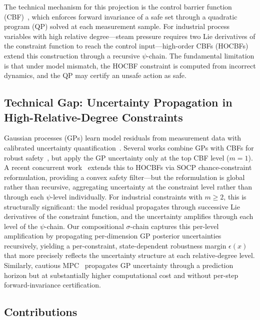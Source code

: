 The technical mechanism for this projection is the control barrier function (CBF)~\cite{ames2017cbf}, which enforces forward invariance of a safe set through a quadratic program (QP) solved at each measurement sample. For industrial process variables with high relative degree---steam pressure requires two Lie derivatives of the constraint function to reach the control input---high-order CBFs (HOCBFs)~\cite{xiao2021hocbf} extend this construction through a recursive $\psi$-chain. The fundamental limitation is that under model mismatch, the HOCBF constraint is computed from incorrect dynamics, and the QP may certify an unsafe action as safe.

\subsection{Technical Gap: Uncertainty Propagation in High-Relative-Degree Constraints}

Gaussian processes (GPs) learn model residuals from measurement data with calibrated uncertainty quantification~\cite{rasmussen2006gp,srinivas2010gp}. Several works combine GPs with CBFs for robust safety~\cite{cheng2019guaranteed,fisac2018general}, but apply the GP uncertainty only at the top CBF level ($m=1$). A recent concurrent work~\cite{aali2024learning} extends this to HOCBFs via SOCP chance-constraint reformulation, providing a convex safety filter---but the reformulation is global rather than recursive, aggregating uncertainty at the constraint level rather than through each $\psi$-level individually. For industrial constraints with $m\geq 2$, this is structurally significant: the model residual propagates through successive Lie derivatives of the constraint function, and the uncertainty amplifies through each level of the $\psi$-chain. Our compositional $\sigma$-chain captures this per-level amplification by propagating per-dimension GP posterior uncertainties recursively, yielding a per-constraint, state-dependent robustness margin $\epsilon(x)$ that more precisely reflects the uncertainty structure at each relative-degree level. Similarly, cautious MPC~\cite{hewing2020cautious} propagates GP uncertainty through a prediction horizon but at substantially higher computational cost and without per-step forward-invariance certification.

\subsection{Contributions}

